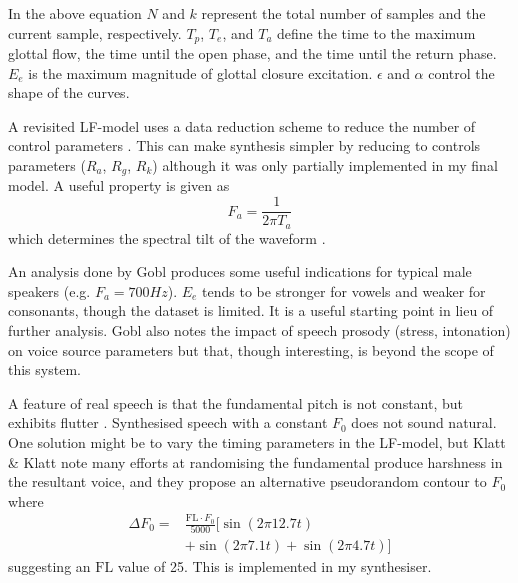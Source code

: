 In the above equation $N$ and $k$ represent the total number of samples and the current sample, respectively. $T_p$, $T_e$, and $T_a$ define the time to the maximum glottal flow, the time until the open phase, and the time until the return phase. $E_e$ is the maximum magnitude of glottal closure excitation. $\epsilon$ and $\alpha$ control the shape of the curves.

A revisited LF-model uses a data reduction scheme to reduce the number of control parameters \cite{Fant1995}. This can make synthesis simpler by reducing to controls parameters ($R_a$, $R_g$, $R_k$) although it was only partially implemented in my final model. A useful property is given as
%
\begin{equation}
	F_a = \dfrac{1}{2\pi T_a}
\end{equation}
%
which determines the spectral tilt of the waveform \cite{Fant1995}. 

An analysis done by Gobl \cite{Gobl1988} produces some useful indications for typical male speakers (e.g. $F_a = \si{700 Hz}$). $E_e$ tends to be stronger for vowels and weaker for consonants, though the dataset is limited. It is a useful starting point in lieu of further analysis. Gobl also notes the impact of speech prosody (stress, intonation) on voice source parameters but that, though interesting, is beyond the scope of this system.

A feature of real speech is that the fundamental pitch is not constant, but exhibits flutter \cite{Klatt1990}. Synthesised speech with a constant $F_0$ does not sound natural. One solution might be to vary the timing parameters in the LF-model, but Klatt \& Klatt note \cite{Klatt1990} many efforts at randomising the fundamental produce harshness in the resultant voice, and they propose an alternative pseudorandom contour to $F_0$ where
%
\begin{equation} \label{eq:flutter}
	\begin{aligned}
		\Delta F_0  = & \frac{\textrm{FL} \cdot F_0}{5000} \big[\sin(2 \pi 12.7t) \\ 
		& + \sin(2 \pi 7.1t) + \sin(2 \pi 4.7t)\big]
	\end{aligned}
\end{equation}
%
suggesting an $\textrm{FL}$ value of 25. This is implemented in my synthesiser.